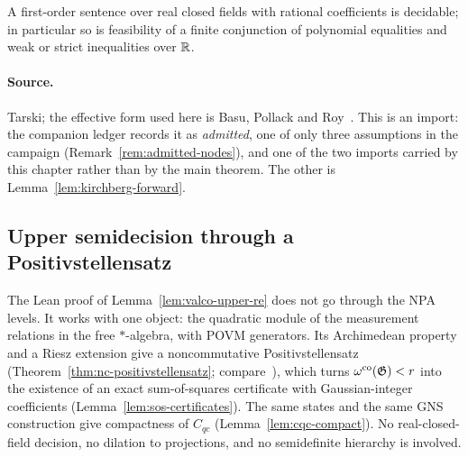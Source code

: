 \effortHard

\begin{lemma}
\label{lem:rcf-decision}
A first-order sentence over real closed fields with rational coefficients is decidable; in
particular so is feasibility of a finite conjunction of polynomial equalities and weak or
strict inequalities over $\mathbb{R}$.
\end{lemma}

\paragraph{Source.} Tarski; the effective form used here is Basu, Pollack and
Roy~\cite{BPR06}. This is an import: the companion ledger records it as \emph{admitted}, one
of only three assumptions in the campaign (Remark~\ref{rem:admitted-nodes}), and one of the
two imports carried by this chapter rather than by the main theorem. The other is
Lemma~\ref{lem:kirchberg-forward}.

\subsection{Upper semidecision through a Positivstellensatz}
\label{sec:ds-positivstellensatz}

The Lean proof of Lemma~\ref{lem:valco-upper-re} does not go through the NPA levels. It works
with one object: the quadratic module of the measurement relations in the free $*$-algebra,
with POVM generators. Its Archimedean property and a Riesz extension give a noncommutative
Positivstellensatz (Theorem~\ref{thm:nc-positivstellensatz}; compare~\cite{HM04}), which turns
$\omega^{\mathrm{co}}(\mathfrak{G}) < r$ into the existence of an exact sum-of-squares certificate with
Gaussian-integer coefficients (Lemma~\ref{lem:sos-certificates}). The same states and the same
GNS construction give compactness of $C_{qc}$ (Lemma~\ref{lem:cqc-compact}). No real-closed-field
decision, no dilation to projections, and no semidefinite hierarchy is involved.

